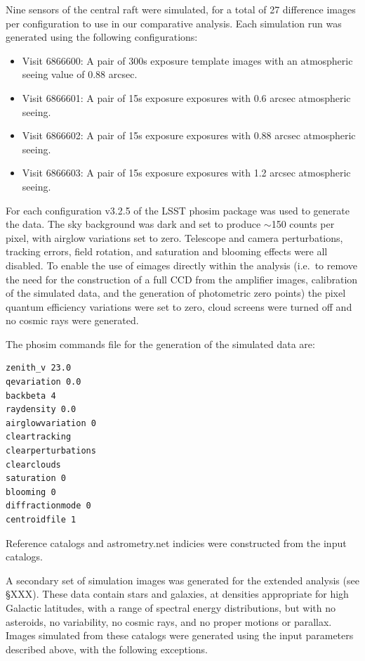 \documentclass[prd, nofootinbib, floatfix, 11pt,tightenlines,times]{article}
\begin{document}
Nine sensors of the central raft were simulated, for a total of 27
difference images per configuration to use in our comparative
analysis.  Each simulation run was generated using the following
configurations:
\begin{itemize}
\item Visit 6866600: A pair of 300s exposure template images with
  an atmospheric seeing value of 0.88 arcsec.
\item Visit 6866601: A pair of 15s exposure exposures with 0.6
 arcsec atmospheric seeing.
\item Visit 6866602: A pair of 15s exposure exposures with 0.88
 arcsec atmospheric seeing.
\item Visit 6866603: A pair of 15s exposure exposures with 1.2
 arcsec atmospheric seeing.
\end{itemize}

For each configuration v3.2.5 of the LSST phosim package was used to
generate the data. The sky background was dark and set to produce
$\sim$150 counts per pixel, with airglow variations set to
zero. Telescope and camera perturbations, tracking errors, field
rotation, and saturation and blooming effects were all disabled. To
enable the use of eimages directly within the analysis (i.e.\ to
remove the need for the construction of a full CCD from the amplifier
images, calibration of the simulated data, and the generation of
photometric zero points) the pixel quantum efficiency variations were
set to zero, cloud screens were turned off and no cosmic rays were
generated.

The phosim commands file for the generation of the simulated data are:
\begin{verbatim}
zenith_v 23.0
qevariation 0.0
backbeta 4
raydensity 0.0
airglowvariation 0
cleartracking
clearperturbations
clearclouds
saturation 0
blooming 0
diffractionmode 0
centroidfile 1
\end{verbatim}


Reference catalogs and astrometry.net indicies were constructed from
the input catalogs.

A secondary set of simulation images was generated for the extended
analysis (see \S XXX). These data contain stars and galaxies, at
densities appropriate for high Galactic latitudes, with a range of
spectral energy distributions, but with no asteroids, no variability,
no cosmic rays, and no proper motions or parallax.  Images simulated
from these catalogs were generated using the input parameters
described above, with the following exceptions.
\end{document}
